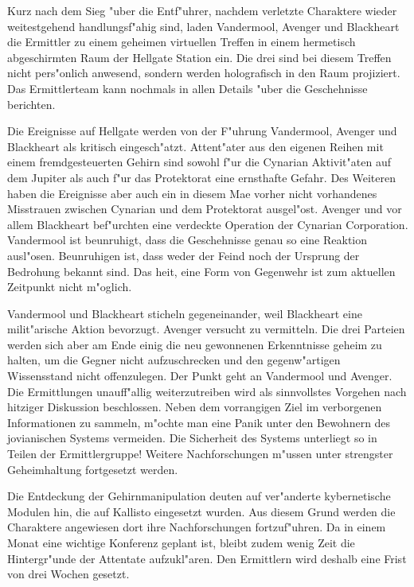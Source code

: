


Kurz nach dem Sieg "uber die Entf"uhrer, nachdem verletzte Charaktere wieder weitestgehend handlungsf"ahig sind, laden Vandermool, Avenger und Blackheart die Ermittler zu einem geheimen virtuellen Treffen in einem hermetisch abgeschirmten Raum der Hellgate Station ein. Die drei sind bei diesem Treffen nicht pers"onlich anwesend, sondern werden holografisch in den Raum projiziert. Das Ermittlerteam kann nochmals in allen Details "uber die Geschehnisse berichten. 

Die Ereignisse auf Hellgate werden von der F"uhrung Vandermool, Avenger und Blackheart als kritisch eingesch"atzt. Attent"ater aus den eigenen Reihen mit einem fremdgesteuerten Gehirn sind sowohl f"ur die Cynarian Aktivit"aten auf dem Jupiter als auch f"ur das Protektorat eine ernsthafte Gefahr. Des Weiteren haben die Ereignisse aber auch ein in diesem Ma\3e vorher nicht vorhandenes Misstrauen zwischen Cynarian und dem Protektorat ausgel"ost. Avenger und vor allem Blackheart bef"urchten eine verdeckte Operation der Cynarian Corporation. Vandermool ist beunruhigt, dass die Geschehnisse genau so eine Reaktion ausl"osen. Beunruhigen ist, dass weder der Feind noch der Ursprung der Bedrohung bekannt sind. Das hei\3t, eine Form von Gegenwehr ist zum aktuellen Zeitpunkt nicht m"oglich.

Vandermool und Blackheart sticheln gegeneinander, weil Blackheart eine milit"arische Aktion bevorzugt. Avenger versucht zu vermitteln. Die drei Parteien werden sich aber am Ende einig die neu gewonnenen Erkenntnisse geheim zu halten, um die Gegner nicht aufzuschrecken und den gegenw"artigen Wissensstand nicht offenzulegen. Der Punkt geht an Vandermool und Avenger. Die Ermittlungen unauff"allig weiterzutreiben wird als sinnvollstes Vorgehen nach hitziger Diskussion beschlossen. Neben dem vorrangigen Ziel im verborgenen Informationen zu sammeln, m"ochte man eine Panik unter den Bewohnern des jovianischen Systems vermeiden. Die Sicherheit des Systems unterliegt so in Teilen der Ermittlergruppe! Weitere Nachforschungen m"ussen unter strengster Geheimhaltung fortgesetzt werden. 

Die Entdeckung der Gehirnmanipulation deuten auf ver"anderte kybernetische Modulen hin, die auf Kallisto eingesetzt wurden. Aus diesem Grund werden die Charaktere angewiesen dort ihre Nachforschungen fortzuf"uhren. Da in einem Monat eine wichtige Konferenz geplant ist, bleibt zudem wenig Zeit die Hintergr"unde der Attentate aufzukl"aren. Den Ermittlern wird deshalb eine Frist von drei Wochen gesetzt. 

